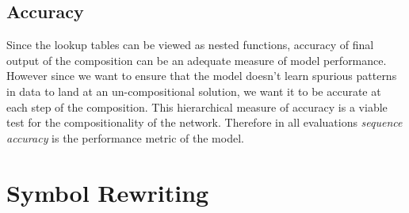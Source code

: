 \subsection{Accuracy}
Since the lookup tables can be viewed as nested functions, accuracy of final output of the composition can be an adequate measure of model performance. However since we want to ensure that the model doesn't learn spurious patterns in data to land at an un-compositional solution, we want it to be accurate at each step of the composition. This hierarchical measure of accuracy is a viable test for the compositionality of the network. Therefore in all evaluations \textit{sequence accuracy} is the performance metric of the model.

\section{Symbol Rewriting} \label{exp:sr}

